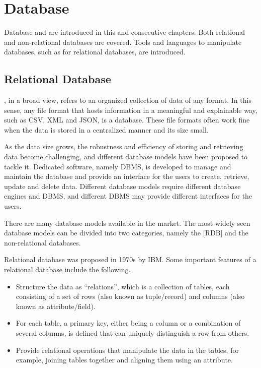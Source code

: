 \chapter{Database}

Database and  are introduced in this and consecutive chapters. Both relational and non-relational databases are covered. Tools and languages to manipulate databases, such as  for relational databases, are introduced.

\section{Relational Database}

, in a broad view, refers to an organized collection of data of any format. In this sense, any file format that hosts information in a meaningful and explainable way, such as CSV, XML and JSON, is a database. These file formats often work fine when the data is stored in a centralized manner and its size small.

As the data size grows, the robustness and efficiency of storing and retrieving data become challenging, and different database models have been proposed to tackle it. Dedicated software, namely DBMS, is developed to manage and maintain the database and provide an interface for the users to create, retrieve, update and delete data. Different database models require different database engines and DBMS, and different DBMS may provide different interfaces for the users.

There are many database models available in the market. The most widely seen database models can be divided into two categories, namely the [RDB] and the non-relational databases.

Relational database was proposed in 1970s by IBM. Some important features of a relational database include the following.
\begin{itemize}
	\item Structure the data as ``relations'', which is a collection of tables, each consisting of a set of rows (also known as tuple/record) and columns (also known as attribute/field).
	\item For each table, a primary key, either being a column or a combination of several columns, is defined that can uniquely distinguish a row from others.
	\item Provide relational operations that manipulate the data in the tables, for example, joining tables together and aligning them using an attribute.
\end{itemize}

